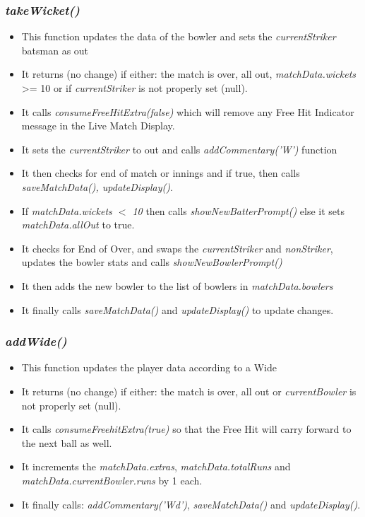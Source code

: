 \documentclass[a4paper,12pt]{article}
\begin{document}
\subsubsection{\textit{takeWicket()}}
\begin{itemize}
\item This function updates the data of the bowler and sets the \textit{currentStriker} batsman as out
\item It returns (no change) if either: the match is over, all out, \textit{matchData.wickets} >= 10 or if \textit{currentStriker} is not properly set (null).
\item It calls \textit{consumeFreeHitExtra(false)} which will remove any Free Hit Indicator message in the Live Match Display.
\item It sets the \textit{currentStriker} to out and calls \textit{addCommentary('W')} function
\item It then checks for end of match or innings and if true, then calls \textit{saveMatchData(), updateDisplay()}.
\item If \textit{matchData.wickets $<$ 10} then calls \textit{showNewBatterPrompt()} else it sets \textit{matchData.allOut} to true.
\item It checks for End of Over, and swaps the \textit{currentStriker} and \textit{nonStriker}, updates the bowler stats and calls \textit{showNewBowlerPrompt()}
\item It then adds the new bowler to the list of bowlers in \textit{matchData.bowlers}
\item It finally calls \textit{saveMatchData()} and \textit{updateDisplay()} to update changes.
\end{itemize}

\subsubsection{\textit{addWide()}}
\label{wide}
\begin{itemize}
\item This function updates the player data according to a Wide 
\item It returns (no change) if either: the match is over, all out or \textit{currentBowler} is not properly set (null).
\item It calls \textit{consumeFreehitExtra(true)} so that the Free Hit will carry forward to the next ball as well.
\item It increments the \textit{matchData.extras}, \textit{matchData.totalRuns} and \textit{matchData.currentBowler.runs} by 1 each.
\item It finally calls: \textit{addCommentary('Wd')}, \textit{saveMatchData()} and \textit{updateDisplay()}.
\end{itemize}
\end{document}
